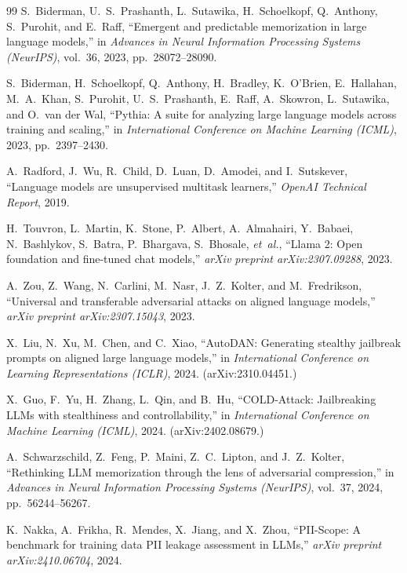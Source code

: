 \documentclass[letterpaper,twocolumn,10pt]{article}
\begin{document}
\begin{thebibliography}{99}
S.~Biderman, U.~S.~Prashanth, L.~Sutawika, H.~Schoelkopf, Q.~Anthony,
S.~Purohit, and E.~Raff, ``Emergent and predictable memorization in large
language models,'' in \emph{Advances in Neural Information Processing Systems
(NeurIPS)}, vol.~36, 2023, pp.~28072--28090.

S.~Biderman, H.~Schoelkopf, Q.~Anthony, H.~Bradley, K.~O'Brien, E.~Hallahan,
M.~A.~Khan, S.~Purohit, U.~S.~Prashanth, E.~Raff, A.~Skowron, L.~Sutawika, and
O.~van der Wal, ``Pythia: A suite for analyzing large language models across
training and scaling,'' in \emph{International Conference on Machine Learning
(ICML)}, 2023, pp.~2397--2430.

A.~Radford, J.~Wu, R.~Child, D.~Luan, D.~Amodei, and I.~Sutskever, ``Language
models are unsupervised multitask learners,'' \emph{OpenAI Technical Report},
2019.

H.~Touvron, L.~Martin, K.~Stone, P.~Albert, A.~Almahairi, Y.~Babaei,
N.~Bashlykov, S.~Batra, P.~Bhargava, S.~Bhosale, \emph{et~al.}, ``Llama 2:
Open foundation and fine-tuned chat models,'' \emph{arXiv preprint
arXiv:2307.09288}, 2023.

A.~Zou, Z.~Wang, N.~Carlini, M.~Nasr, J.~Z.~Kolter, and M.~Fredrikson,
``Universal and transferable adversarial attacks on aligned language models,''
\emph{arXiv preprint arXiv:2307.15043}, 2023.

X.~Liu, N.~Xu, M.~Chen, and C.~Xiao, ``AutoDAN: Generating stealthy jailbreak
prompts on aligned large language models,'' in \emph{International Conference
on Learning Representations (ICLR)}, 2024. (arXiv:2310.04451.)

X.~Guo, F.~Yu, H.~Zhang, L.~Qin, and B.~Hu, ``COLD-Attack: Jailbreaking LLMs
with stealthiness and controllability,'' in \emph{International Conference on
Machine Learning (ICML)}, 2024. (arXiv:2402.08679.)

A.~Schwarzschild, Z.~Feng, P.~Maini, Z.~C.~Lipton, and J.~Z.~Kolter,
``Rethinking LLM memorization through the lens of adversarial compression,'' in
\emph{Advances in Neural Information Processing Systems (NeurIPS)}, vol.~37,
2024, pp.~56244--56267.

K.~Nakka, A.~Frikha, R.~Mendes, X.~Jiang, and X.~Zhou, ``PII-Scope: A
benchmark for training data PII leakage assessment in LLMs,'' \emph{arXiv
preprint arXiv:2410.06704}, 2024.


\end{thebibliography}
\end{document}
